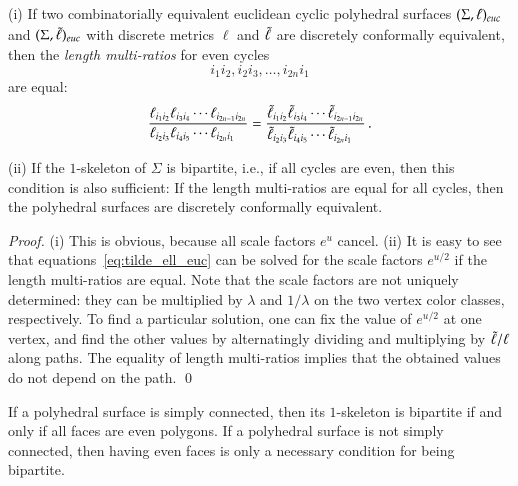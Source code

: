 \documentclass[Thesis]{subfiles}
\begin{document}
\begin{proposition}
  \label{prop:bipartite}
  (i) If two combinatorially equivalent euclidean cyclic polyhedral
  surfaces $(\Sigma,\ell)_{\euc}$ and\/ $(\Sigma,\ellt)_{\euc}$ with
  discrete metrics $\ell$ and $\tilde{\ell}$ are discretely conformally
  equivalent, then the\/ \emph{length multi-ratios} for even cycles
  \begin{equation*}
    i_{1}i_{2},i_{2}i_{3}, \ldots, i_{2n}i_{1}
  \end{equation*}
  are equal:
  \begin{equation}
    \label{eq:equal_multiratios}
    \frac{\ell_{i_{1}i_{2}}\ell_{i_{3}i_{4}}\cdots\ell_{i_{2n-1}i_{2n}}}
    {\ell_{i_{2}i_{3}}\ell_{i_{4}i_{5}}\cdots\ell_{i_{2n}i_{1}}\hfill}
    =
    \frac{\ellt_{i_{1}i_{2}}\ellt_{i_{3}i_{4}}\cdots\ellt_{i_{2n-1}i_{2n}}}
    {\ellt_{i_{2}i_{3}}\ellt_{i_{4}i_{5}}\cdots\ellt_{i_{2n}i_{1}}\hfill}    
    \,.
  \end{equation}
  
  (ii) If the $1$-skeleton of\/ $\Sigma$ is bipartite, i.e., if all
  cycles are even, then this condition is also sufficient: If the
  length multi-ratios are equal for all cycles, then the
  polyhedral surfaces are discretely conformally equivalent.
\end{proposition}

\begin{proof}
  (i) This is obvious, because all scale factors $e^{u}$ cancel.
  (ii) It is easy to see that equations~\eqref{eq:tilde_ell_euc} can
  be solved for the scale factors $e^{u/2}$ if the length multi-ratios
  are equal. Note that the scale factors are not uniquely determined:
  they can be multiplied by $\lambda$ and $1/\lambda$ on the two
  vertex color classes, respectively. To find a particular solution,
  one can fix the value of $e^{u/2}$ at one vertex, and find the
  other values by alternatingly dividing and multiplying by
  $\tilde{\ell}/\ell$ along paths. The equality of length multi-ratios
  implies that the obtained values do not depend on the path.
  \qed
\end{proof}

\begin{remark}
  If a polyhedral surface is simply connected, then its $1$-skeleton
  is bipartite if and only if all faces are even polygons. If a
  polyhedral surface is not simply connected, then having even faces
  is only a necessary condition for being bipartite.
\end{remark}
\end{document}

